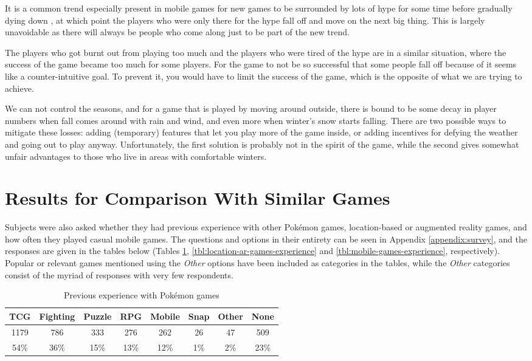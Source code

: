 It is a common trend especially present in mobile games for new games to be surrounded by lots of hype for some time before gradually dying down , at which point the players who were only there for the hype fall off and move on the next big thing. This is largely unavoidable as there will always be people who come along just to be part of the new trend.

The players who got burnt out from playing too much and the players who were tired of the hype are in a similar situation, where the success of the game became too much for some players. For the game to not be so successful that some people fall off because of it seems like a counter-intuitive goal. To prevent it, you would have to limit the success of the game, which is the opposite of what we are trying to achieve.

We can not control the seasons, and for a game that is played by moving around outside, there is bound to be some decay in player numbers when fall comes around with rain and wind, and even more when winter's snow starts falling. There are two possible ways to mitigate these losses: adding (temporary) features that let you play more of the game inside, or adding incentives for defying the weather and going out to play anyway. Unfortunately, the first solution is probably not in the spirit of the game, while the second gives somewhat unfair advantages to those who live in areas with comfortable winters.

\section{Results for Comparison With Similar Games}
Subjects were also asked whether they had previous experience with other Pokémon games, location-based or augmented reality games, and how often they played casual mobile games. The questions and options in their entirety can be seen in Appendix \ref{appendix:survey}, and the responses are given in the tables below (Tables \ref{tbl:pokemon-games-experience}, \ref{tbl:location-ar-games-experience} and \ref{tbl:mobile-games-experience}, respectively). Popular or relevant games mentioned using the \emph{Other} options have been included as categories in the tables, while the \emph{Other} categories consist of the myriad of responses with very few respondents.

\begin{table}[h]
	\centering
	\caption{Previous experience with Pokémon games}
	\label{tbl:pokemon-games-experience}
	\begin{tabular}{|c|c|c|c|c|c|c|c|}
		\hline
		\textbf{TCG} & \textbf{Fighting} & \textbf{Puzzle} & \textbf{RPG} & \textbf{Mobile} & \textbf{Snap} & \textbf{Other} & \textbf{None}\\
		\hline\hline
		1179	& 786	& 333	& 276	& 262	& 26	& 47	& 509\\
		54\%	& 36\%	& 15\%	& 13\%	& 12\%	& 1\%	& 2\%	& 23\%\\\hline
	\end{tabular}
\end{table}


